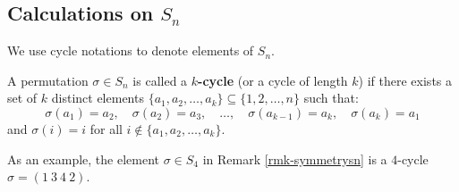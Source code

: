 \subsection*{Calculations on $S_n$}
We use cycle notations to denote elements of $S_n$. 

\begin{definition}
A permutation $\sigma \in S_n$ is called a \textbf{$k$-cycle} (or a cycle of length $k$) if there exists a set of $k$ distinct elements $\{a_1, a_2, \dots, a_k\} \subseteq \{1, 2, \dots, n\}$ such that:
\[
\sigma(a_1) = a_2, \quad \sigma(a_2) = a_3, \quad \dots, \quad \sigma(a_{k-1}) = a_k, \quad \sigma(a_k) = a_1
\]
and $\sigma(i) = i$ for all $i \notin \{a_1, a_2, \dots, a_k\}$.

As an example, the element $\sigma \in S_4$ in Remark \ref{rmk-symmetrysn} is a $4$-cycle $\sigma =(1\ 3\ 4\ 2)$.
\end{definition} 

